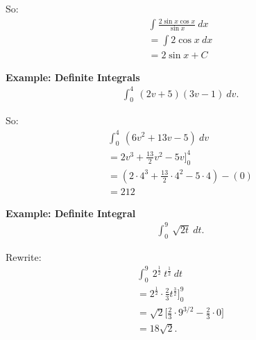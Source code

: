 \documentclass{report}
\begin{document}
\bigbreak \noindent
So:
\begin{align*}
  \int \frac{2\sin{x}\cos{x}}{\sin{x}}\ dx \\
  = \int 2\cos{x}\ dx \\
  \boxed{= 2\sin{x} + C }
\end{align*}

\bigbreak \noindent 
\begin{mdframed}
  \textbf{Example: Definite Integrals}
  \begin{align*}
    \int_{0}^{4}\ (2v+5)(3v-1)\ dv
  .\end{align*} 
\end{mdframed}

\bigbreak \noindent
So:
\begin{align*}
  \int_{0}^{4}\ (6v^{2}+13v-5)\ dv \\
=2v^{3} +\frac{13}{2}v^{2}-5v\bigg]_{0}^{4} \\
= (2 \cdot 4^{3} + \frac{13}{2}\cdot 4^{2}-5\cdot 4)- (0) \\
\boxed{=212}
\end{align*}

\pagebreak \bigbreak \noindent
\bigbreak \noindent 
\begin{mdframed}
  \textbf{Example: Definite Integral}
  \begin{align*}
    \int_{0}^{9}\ \sqrt{2t}\ dt
  .\end{align*} 
\end{mdframed}

\bigbreak \noindent \bigbreak \noindent
Rewrite:
\begin{align*}
  \int_{0}^{9}\ 2^{\frac{1}{2}}\ t^{\frac{1}{2}}\ dt \\
= 2^{\frac{1}{2}} \cdot \frac{2}{3}t^{\frac{3}{2}}\bigg]_{0}^{9} \\
= \sqrt{2}\bigg[\frac{2}{3}\cdot 9^{3/2} -\frac{2}{3}\cdot 0\bigg] \\
\boxed{=18\sqrt{2}}
.\end{align*}
\end{document}
